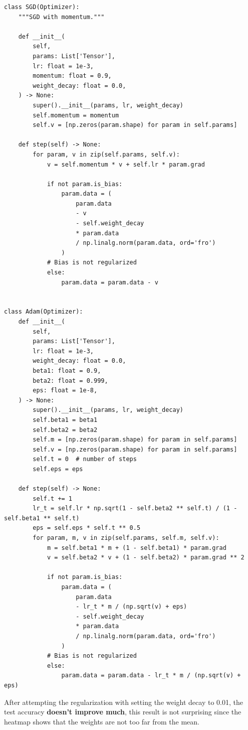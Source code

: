 \documentclass[a4paper, 11pt]{article} %
\begin{document}
\begin{lstlisting}
class SGD(Optimizer):
    """SGD with momentum."""

    def __init__(
        self,
        params: List['Tensor'],
        lr: float = 1e-3,
        momentum: float = 0.9,
        weight_decay: float = 0.0,
    ) -> None:
        super().__init__(params, lr, weight_decay)
        self.momentum = momentum
        self.v = [np.zeros(param.shape) for param in self.params]

	def step(self) -> None:
        for param, v in zip(self.params, self.v):
            v = self.momentum * v + self.lr * param.grad

            if not param.is_bias:
                param.data = (
                    param.data
                    - v
                    - self.weight_decay
                    * param.data
                    / np.linalg.norm(param.data, ord='fro')
                )
            # Bias is not regularized
            else:
                param.data = param.data - v


class Adam(Optimizer):
	def __init__(
		self,
		params: List['Tensor'],
		lr: float = 1e-3,
		weight_decay: float = 0.0,
		beta1: float = 0.9,
		beta2: float = 0.999,
		eps: float = 1e-8,
	) -> None:
		super().__init__(params, lr, weight_decay)
		self.beta1 = beta1
		self.beta2 = beta2
		self.m = [np.zeros(param.shape) for param in self.params]
		self.v = [np.zeros(param.shape) for param in self.params]
		self.t = 0  # number of steps
		self.eps = eps

	def step(self) -> None:
        self.t += 1
        lr_t = self.lr * np.sqrt(1 - self.beta2 ** self.t) / (1 - self.beta1 ** self.t)
        eps = self.eps * self.t ** 0.5
        for param, m, v in zip(self.params, self.m, self.v):
            m = self.beta1 * m + (1 - self.beta1) * param.grad
            v = self.beta2 * v + (1 - self.beta2) * param.grad ** 2

            if not param.is_bias:
                param.data = (
                    param.data
                    - lr_t * m / (np.sqrt(v) + eps)
                    - self.weight_decay
                    * param.data
                    / np.linalg.norm(param.data, ord='fro')
                )
            # Bias is not regularized
            else:
                param.data = param.data - lr_t * m / (np.sqrt(v) + eps)
\end{lstlisting}

After attempting the regularization with setting the weight decay to 0.01, the test accuracy
\textbf{doesn't improve much}, this result is not surprising since the heatmap shows that the
weights are not too far from the mean.
\end{document}
